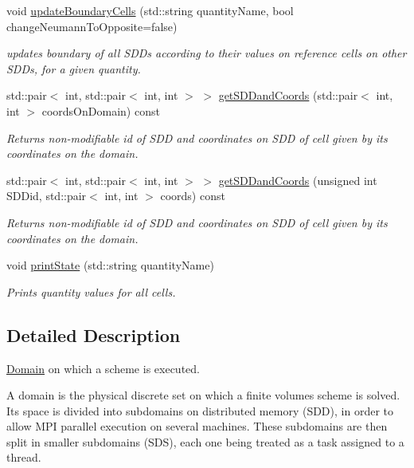 \begin{DoxyCompactItemize}
void \hyperlink{classDomain_af169473470489edc4235399887c10da0}{update\+Boundary\+Cells} (std\+::string quantity\+Name, bool change\+Neumann\+To\+Opposite=false)
\begin{DoxyCompactList}\small\item\em updates boundary of all S\+D\+Ds according to their values on reference cells on other S\+D\+Ds, for a given quantity. \end{DoxyCompactList}\item 
std\+::pair$<$ int, std\+::pair$<$ int, int $>$ $>$ \hyperlink{classDomain_a155bbf1a1abd44c98cf78c090259b5a4}{get\+S\+D\+Dand\+Coords} (std\+::pair$<$ int, int $>$ coords\+On\+Domain) const
\begin{DoxyCompactList}\small\item\em Returns non-\/modifiable id of S\+DD and coordinates on S\+DD of cell given by its coordinates on the domain. \end{DoxyCompactList}\item 
std\+::pair$<$ int, std\+::pair$<$ int, int $>$ $>$ \hyperlink{classDomain_a777cc4eed9570aea2477ef41f26566ff}{get\+S\+D\+Dand\+Coords} (unsigned int S\+D\+Did, std\+::pair$<$ int, int $>$ coords) const
\begin{DoxyCompactList}\small\item\em Returns non-\/modifiable id of S\+DD and coordinates on S\+DD of cell given by its coordinates on the domain. \end{DoxyCompactList}\item 
void \hyperlink{classDomain_a1163559d75540c4cd29c7aa775feca80}{print\+State} (std\+::string quantity\+Name)
\begin{DoxyCompactList}\small\item\em Prints quantity values for all cells. \end{DoxyCompactList}\end{DoxyCompactItemize}


\subsection{Detailed Description}
\hyperlink{classDomain}{Domain} on which a scheme is executed. 

A domain is the physical discrete set on which a finite volumes scheme is solved. Its space is divided into subdomains on distributed memory (S\+DD), in order to allow M\+PI parallel execution on several machines. These subdomains are then split in smaller subdomains (S\+DS), each one being treated as a task assigned to a thread. 

